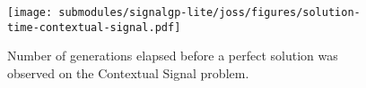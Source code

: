\begin{figure}[h]

\centering
\texttt{[image: submodules/signalgp-lite/joss/figures/solution-time-contextual-signal.pdf]}

\caption{%
Number of generations elapsed before a perfect solution was observed on the Contextual Signal problem.
} \label{fig:tts-context}

\end{figure}
